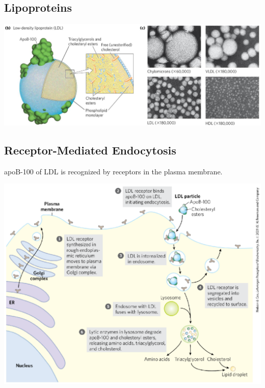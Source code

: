 \documentclass[10pt]{article}
\begin{document}
\subsection*{Lipoproteins}
\begin{center}
    \includegraphics*[width=\textwidth]{L3_1.png}
\end{center}

\subsection*{Receptor-Mediated Endocytosis}
apoB-100 of LDL is recognized by receptors in the plasma membrane.
\begin{center}
    \includegraphics*[scale=0.6]{L3_2.png}
\end{center}
\end{document}
